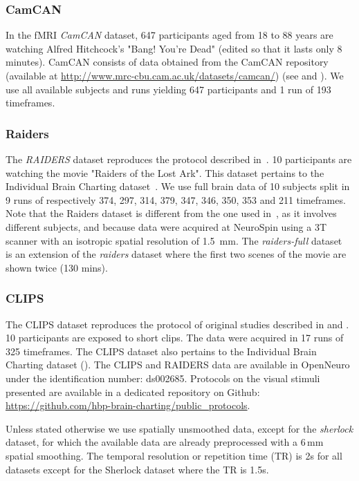 \subsubsection{CamCAN}
In the fMRI \emph{CamCAN} dataset, 647 participants aged from 18 to 88 years are watching Alfred Hitchcock's "Bang! You're Dead" (edited so that it lasts only 8 minutes).
% 
CamCAN consists of data obtained from the CamCAN repository (available at \url{http://www.mrc-cbu.cam.ac.uk/datasets/camcan/}) (see \cite{taylor2017cambridge} and \cite{shafto2014cambridge}).
% 
We use all available subjects and runs yielding 647 participants and 1 run of 193 timeframes.


\subsubsection{Raiders}
The \emph{RAIDERS} dataset reproduces the protocol described
in~\cite{haxby2011common}. 10 participants are watching the movie "Raiders
of the Lost Ark". This dataset pertains to the Individual Brain Charting
dataset~\cite{ibc, ibc2}. 
% 
We use full brain data of 10 subjects split in 9 runs of respectively 374, 297, 314, 379, 347, 346, 350, 353 and 211 timeframes.
%
Note that the Raiders dataset is different from the one used in~\cite{chen2015reduced}, as it involves different subjects, and because data were acquired at NeuroSpin using a 3T scanner with an isotropic spatial resolution of 1.5 mm.
The \emph{raiders-full} dataset~\cite{ibc, ibc2} is an extension of the \emph{raiders} dataset where the first two scenes of the movie are shown twice (130 mins).

\subsubsection{CLIPS}
The CLIPS dataset reproduces the protocol of original studies described in
\cite{nishimoto2011reconstructing} and \cite{huth2012continuous}. 10
participants are exposed to short clips. The data were acquired in 17 runs of 325 timeframes. 
%
The CLIPS dataset also pertains to the Individual Brain Charting dataset
(\cite{ibc, ibc2}).
%
The CLIPS and RAIDERS data are available in OpenNeuro under the identification
number: ds002685. Protocols on the visual stimuli presented are available in a dedicated repository on Github: \url{https://github.com/hbp-brain-charting/public_protocols}.

Unless stated otherwise we use spatially unsmoothed data, except for the
\emph{sherlock} dataset, for which the available data are already preprocessed
with a 6\,mm spatial smoothing. The temporal resolution or repetition time (TR) is 2s for all datasets except for the Sherlock dataset where the TR is 1.5s.
%

